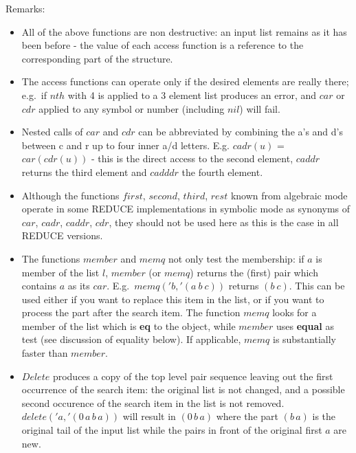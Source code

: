 \documentclass[11pt]{article}
\makeatletter
\newcommand{\reduce}{\small REDUCE}
\newcommand{\ttindex}[1]{\index{#1@{\texttt{#1}}}}
\makeatother
\begin{document}
Remarks:
\begin{itemize}
\item All of the above functions are non destructive: an
  input list remains as it has been before - the value of each
  access function is a reference to the corresponding part of the
  structure. 
\item The access functions can operate only if the desired elements
  are really there; e.g.\  if $nth$ with 4 is applied to a 3 element
  list produces an error, and $car$ or $cdr$ applied to any symbol
  or number (including $nil$) will fail.
\item Nested calls of $car$ and $cdr$ can be abbreviated by
  combining the a's and d's between c and r up to four inner a/d letters.
  E.g. $cadr(u)$ = $car(cdr(u))$ \ttindex{c...r}
   - this is the direct access
  to the second element, $caddr$ returns the third element and
  $cadddr$ the fourth element.
\item Although the functions $first$, $second$, $third$, $rest$
  known from algebraic mode operate in some {\reduce}
  implementations in symbolic mode as synonyms of $car$,
  $cadr$, $caddr$, $cdr$, they should not be used here as
  this is the case in all {\reduce} versions.
\item The functions $member$ and $memq$ not only test the membership:
  if $a$ is member of the list $l$, $member$ (or $memq$) returns the (first)
  pair which contains $a$ as its $car$. E.g.\  $memq('b,'(a\ b\ c))$
  returns $(b\ c)$. This can be used either if you want to replace
  this item in the list, or if you want to process the part after
  the search item. 
  The function $memq$ looks for a member of the list which is {\bf eq}
  to the object, while $member$ uses {\bf equal} as test (see discussion
  of equality below).  If applicable, $memq$ is substantially faster than
  $member$.
\item $Delete$ produces a copy of the top level pair sequence leaving  
  out the first occurrence of the search item: the original list is
  not changed, and a possible second occurence of the search item
  in the list is not removed. $delete('a,'(0\,a\,b\,a))$ will result
  in $(0\,b\,a)$ where the part $(b\,a)$ is the original tail of the
  input list while the pairs in front of the original first $a$
  are new.
\end{itemize}
\end{document}
